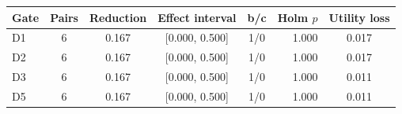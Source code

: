 \begin{tabular}{lccccrc}
\toprule
Gate & Pairs & Reduction & Effect interval & b/c & Holm $p$ & Utility loss \\
\midrule
D1 & 6 & 0.167 & [0.000, 0.500] & 1/0 & 1.000 & 0.017 \\
D2 & 6 & 0.167 & [0.000, 0.500] & 1/0 & 1.000 & 0.017 \\
D3 & 6 & 0.167 & [0.000, 0.500] & 1/0 & 1.000 & 0.011 \\
D5 & 6 & 0.167 & [0.000, 0.500] & 1/0 & 1.000 & 0.011 \\
\bottomrule
\end{tabular}
